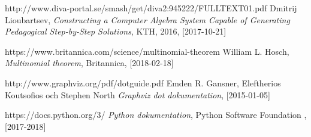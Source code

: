 \documentclass[12pt,a4paper]{article}
\begin{document}
\begin{thebibliography}{9}

  http://www.diva-portal.se/smash/get/diva2:945222/FULLTEXT01.pdf
  Dmitrij Lioubartsev,
  \textit{Constructing a Computer Algebra System Capable of Generating Pedagogical Step-by-Step Solutions},
  KTH,
  2016,
  [2017-10-21]

  https://www.britannica.com/science/multinomial-theorem
  William L. Hosch,
  \textit{Multinomial theorem},
  Britannica,
  [2018-02-18]

  http://www.graphviz.org/pdf/dotguide.pdf
  Emden R. Gansner, Eleftherios Koutsofios och Stephen North
  \textit{Graphviz dot dokumentation},
  [2015-01-05]

  https://docs.python.org/3/
  \textit{Python dokumentation},
  Python Software Foundation ,
  [2017-2018]
\end{thebibliography}
\newpage
\end{document}
